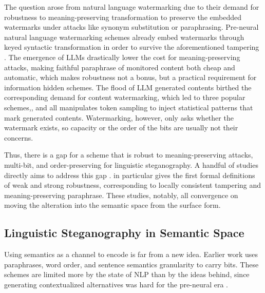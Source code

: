 The question arose from natural language watermarking due to their demand for robustness to meaning-preserving transformation to preserve the embedded watermarks under attacks like synonym substitution or paraphrasing.
Pre-neural natural language watermarking schemes already embed watermarks through keyed syntactic transformation in order to survive the aforementioned tampering \citep{Atallah2001NaturalLW, atallah2002natural, Topkara2006words}.
The emergence of LLMs drastically lower the cost for meaning-preserving attacks, making faithful paraphrase of monitored content both cheap and automatic, which makes robustness not a bonus, but a practical requirement for information hidden schemes.
The flood of LLM generated contents birthed the corresponding demand for content watermarking, which led to three popular schemes,\citet{kuditipudi2023robust}, \citet{pmlr-v202-kirchenbauer23a} and \citet{dathathri2024scalable} all manipulates token sampling to inject statistical patterns that mark generated contents.
Watermarking, however, only asks whether the watermark exists, so capacity or the order of the bits are usually not their concerns.

Thus, there is a gap for a scheme that is robust to meaning-preserving attacks, multi-bit, and order-preserving for linguistic steganography.
A handful of studies directly aims to address this gap \citep{zamir2024undetectable,wu2024generative,bai2024semantic,perry2025robust}.
\citet{perry2025robust} in particular gives the first formal definitions of weak and strong robustness, corresponding to locally consistent tampering and meaning-preserving paraphrase.
These studies, notably, all convergence on moving the alteration into the semantic space from the surface form.

\subsection{Linguistic Steganography in Semantic Space}
Using semantics as a channel to encode is far from a new idea.
Earlier work \citep{atallah2002natural, Topkara2006words, chang2010linguistic} uses paraphrases, word order, and sentence semantics granularity to carry bits.
These schemes are limited more by the state of NLP than by the ideas behind, since generating contextualized alternatives was hard for the pre-neural era \citep{chang2010linguistic}.

